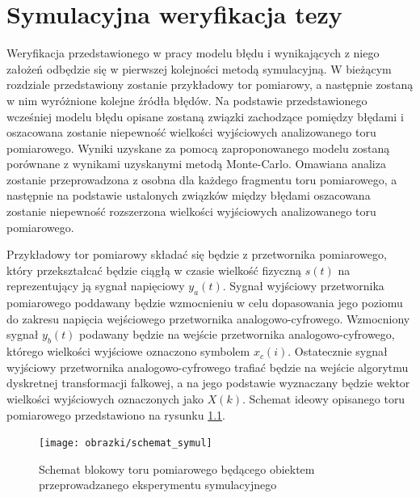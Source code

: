 \chapter{Symulacyjna weryfikacja tezy}

Weryfikacja przedstawionego w pracy modelu błędu i wynikających z niego założeń odbędzie się w pierwszej kolejności metodą symulacyjną. W bieżącym rozdziale przedstawiony zostanie przykładowy tor pomiarowy, a następnie zostaną w nim wyróżnione kolejne źródła błędów. Na podstawie przedstawionego wcześniej modelu błędu opisane zostaną związki zachodzące pomiędzy błędami i oszacowana zostanie niepewność wielkości wyjściowych analizowanego toru pomiarowego. Wyniki uzyskane za pomocą zaproponowanego modelu zostaną porównane z wynikami uzyskanymi metodą Monte-Carlo. Omawiana analiza zostanie przeprowadzona z osobna dla każdego fragmentu toru pomiarowego, a następnie na podstawie ustalonych związków między błędami oszacowana zostanie niepewność rozszerzona wielkości wyjściowych analizowanego toru pomiarowego.

Przykładowy tor pomiarowy składać się będzie z przetwornika pomiarowego, który przekształcać będzie ciągłą w czasie wielkość fizyczną $s(t)$ na reprezentujący ją sygnał napięciowy $y_{a}(t)$. Sygnał wyjściowy przetwornika pomiarowego poddawany będzie wzmocnieniu w celu dopasowania jego poziomu do zakresu napięcia wejściowego przetwornika analogowo-cyfrowego. Wzmocniony sygnał $y_{b}(t)$ podawany będzie na wejście przetwornika analogowo-cyfrowego, którego wielkości wyjściowe oznaczono symbolem $x_{c}(i)$. Ostatecznie sygnał wyjściowy przetwornika analogowo-cyfrowego trafiać będzie na wejście algorytmu dyskretnej transformacji falkowej, a na jego podstawie wyznaczany będzie wektor wielkości wyjściowych oznaczonych jako $X(k)$. Schemat ideowy opisanego toru pomiarowego przedstawiono na rysunku \ref{fig_chain_symul}.

\begin{figure}[htb!]
\begin{center}
\texttt{[image: obrazki/schemat\_symul]}
\caption{Schemat blokowy toru pomiarowego będącego obiektem przeprowadzanego eksperymentu symulacyjnego \label{fig_chain_symul}}
\end{center}
\end{figure}

